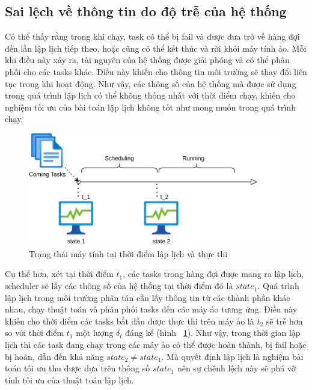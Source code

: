 \documentclass{my_style}
\begin{document}
\subsection{Sai lệch về thông tin do độ trễ của hệ thống}
Có thể thấy rằng trong khi chạy, task có thể bị fail và được đưa trở về hàng đợi đến lần lập lịch tiếp theo, hoặc cũng có thể kết thúc và rời khỏi máy tính ảo. Mỗi khi điều này xảy ra, tài nguyên của hệ thống được giải phóng và có thể phân phối cho các tasks khác. Điều này khiến cho thông tin môi trường sẽ thay đổi liên tục trong khi hoạt động. Như vậy, các thông số của hệ thống mà được sử dụng trong quá trình lập lịch có thể không thống nhất với thời điểm chạy, khiến cho nghiệm tối ưu của bài toán lập lịch không tốt như mong muốn trong quá trình chạy.\\
\begin{figure}[h!]
	\centering
	\includegraphics[scale=0.8]{images/state_change.png}
	\caption{Trạng thái máy tính tại thời điểm lập lịch và thực thi}
	\label{fig:statechange}
\end{figure}

\noindent
Cụ thể hơn, xét tại thời điểm $t_{1}$, các tasks trong hàng đợi được mang ra lập lịch, scheduler sẽ lấy các thông số của hệ thống tại thời điểm đó là $state_{1}$. Quá trình lập lịch trong môi trường phân tán cần lấy thông tin từ các thành phần khác nhau, chạy thuật toán và phân phối tasks đến các máy ảo tương ứng. Điều này khiến cho thời điểm các tasks bắt đầu được thực thi trên máy ảo là $t_{2}$ sẽ trễ hơn so với thời điểm $t_{1}$ một lượng $\delta_{t}$ đáng kể (hình ~\ref{fig:statechange}). Như vậy, trong thời gian lập lịch thì các task đang chạy trong các máy ảo có thể được hoàn thành, bị fail hoặc bị hoãn, dẫn đến khả năng $state_{2} \neq state_{1}$. Mà quyết định lập lịch là nghiệm bài toán tối ưu thu được dựa trên thông số $state_{1}$ nên sự chênh lệch này sẽ phá vỡ tính tối ưu của thuật toán lập lịch. 
\end{document}

